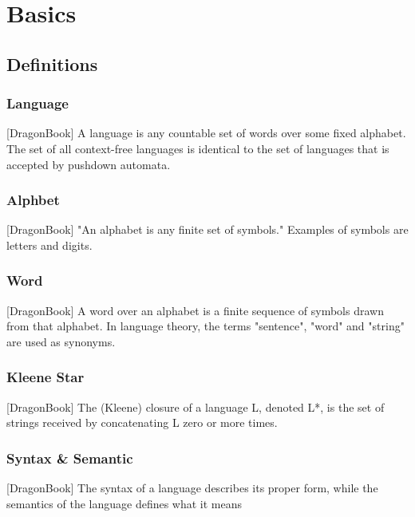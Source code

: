 \chapter{Basics}
\label{cha:basics}
\section{Definitions}
\subsection{Language}[DragonBook]
A language is any countable set of words over some fixed alphabet. The set of all context-free languages is identical to the set of languages that is accepted by pushdown automata.

\subsection{Alphbet} [DragonBook]
"An alphabet is any finite set of symbols." Examples of symbols are letters and digits.

\subsection{Word}  [DragonBook]
A word over an alphabet is a finite sequence of symbols drawn from that alphabet. In language theory, the terms "sentence", "word" and "string" are used as synonyms.

\subsection{Kleene Star}  [DragonBook]
The (Kleene) closure of a language L, denoted L*, is the set of strings received by concatenating L zero or more times. 


\subsection{Syntax \& Semantic}  [DragonBook]
The syntax of a language describes its proper form, while the semantics of the language defines what it means



